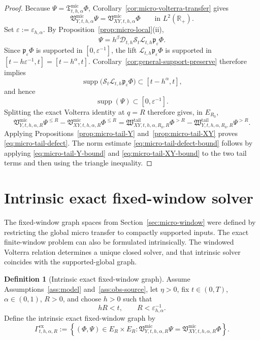 \documentclass[11pt,a4paper]{amsart}
\theoremstyle{plain}
\theoremstyle{definition}
\newtheorem{definition}[theorem]{Definition}
\theoremstyle{remark}
\newcommand{\R}{\mathbb{R}}
\begin{document}
\begin{proof}
Because \(\Psi=\mathfrak T_{t,h,\alpha}^{\mathrm{mic}}\Phi\), Corollary~\ref{cor:micro-volterra-transfer}
gives
\[
\mathfrak V_{Y,t,h,\alpha}^{\mathrm{mic}}\Psi
=
\mathfrak V_{XY,t,h,\alpha}^{\mathrm{mic}}\Phi
\qquad\text{in }L^2(\R_+).
\]
Set \(\varepsilon:=\varepsilon_{h,\alpha}\). By Proposition~\ref{prop:micro-local}(ii),
\[
\Psi
=
h^\beta
\mathcal D_{t,h}\mathcal S_t\mathcal L_{t,h}\mathfrak p_{\varepsilon}\Phi.
\]
Since \(\mathfrak p_{\varepsilon}\Phi\) is supported in \([0,\varepsilon^{-1}]\), the lift
\(\mathcal L_{t,h}\mathfrak p_{\varepsilon}\Phi\) is supported in
\([t-h\varepsilon^{-1},t]=[t-h^\alpha,t]\). Corollary~\ref{cor:general-support-preserve} therefore
implies
\[
\operatorname{supp}\bigl(\mathcal S_t\mathcal L_{t,h}\mathfrak p_{\varepsilon}\Phi\bigr)
\subset [t-h^\alpha,t],
\]
and hence
\[
\operatorname{supp}(\Psi)\subset [0,\varepsilon^{-1}].
\]
Splitting the exact Volterra identity at \(q=R\) therefore gives, in \(E_{R_0}\),
\[
\mathfrak V_{Y,t,h,\alpha,R}^{\mathrm{mic}}\Psi^{\le R}
-
\mathfrak V_{XY,t,h,\alpha,R}^{\mathrm{mic}}\Phi^{\le R}
=
\mathfrak W_{XY,t,h,\alpha,R_0,R}^{\mathrm{tail}}\Phi^{>R}
-
\mathfrak W_{Y,t,h,\alpha,R_0,R}^{\mathrm{tail}}\Psi^{>R}.
\]
Applying Propositions~\ref{prop:micro-tail-Y} and~\ref{prop:micro-tail-XY} proves
\eqref{eq:micro-tail-defect}. The norm estimate \eqref{eq:micro-tail-defect-bound} follows by applying
\eqref{eq:micro-tail-Y-bound} and \eqref{eq:micro-tail-XY-bound} to the two tail terms and then
using the triangle inequality.
\end{proof}

\section{Intrinsic exact fixed-window solver}\label{sec:micro-solver}

The fixed-window graph spaces from Section~\ref{sec:micro-window} were defined by restricting the
global micro transfer to compactly supported inputs.  The exact finite-window problem can also be
formulated intrinsically.  The windowed Volterra relation determines a unique closed solver, and
that intrinsic solver coincides with the supported-global graph.

\begin{definition}[Intrinsic exact fixed-window graph]
\label{def:micro-window-solver}
Assume Assumptions~\ref{ass:model} and~\ref{ass:obs-source}, let \(\eta>0\), fix
\(t\in(0,T)\), \(\alpha\in(0,1)\), \(R>0\), and choose \(h>0\) such that
\[
hR<t,
\qquad
R<\varepsilon_{h,\alpha}^{-1}.
\]
Define the intrinsic exact fixed-window graph by
\[
\Gamma_{t,h,\alpha,R}^{\mathrm{ex}}
:=
\left\{
(\Phi,\Psi)\in E_R\times E_R:
\mathfrak V_{Y,t,h,\alpha,R}^{\mathrm{mic}}\Psi
=
\mathfrak V_{XY,t,h,\alpha,R}^{\mathrm{mic}}\Phi
\right\}.
\]
\end{definition}
\end{document}
